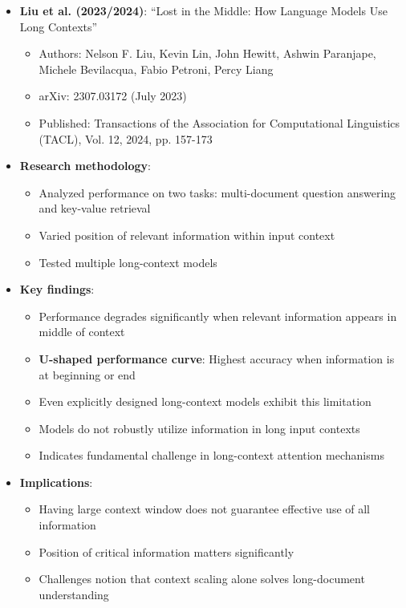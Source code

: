 \documentclass[11pt,letterpaper]{article}
\begin{document}
\begin{itemize}[leftmargin=*]
    \item \textbf{Liu et al. (2023/2024)}: ``Lost in the Middle: How Language Models Use Long Contexts''
    \begin{itemize}
        \item Authors: Nelson F. Liu, Kevin Lin, John Hewitt, Ashwin Paranjape, Michele Bevilacqua, Fabio Petroni, Percy Liang
        \item arXiv: 2307.03172 (July 2023)
        \item Published: Transactions of the Association for Computational Linguistics (TACL), Vol. 12, 2024, pp. 157-173
    \end{itemize}

    \item \textbf{Research methodology}:
    \begin{itemize}
        \item Analyzed performance on two tasks: multi-document question answering and key-value retrieval
        \item Varied position of relevant information within input context
        \item Tested multiple long-context models
    \end{itemize}

    \item \textbf{Key findings}:
    \begin{itemize}
        \item Performance degrades significantly when relevant information appears in middle of context
        \item \textbf{U-shaped performance curve}: Highest accuracy when information is at beginning or end
        \item Even explicitly designed long-context models exhibit this limitation
        \item Models do not robustly utilize information in long input contexts
        \item Indicates fundamental challenge in long-context attention mechanisms
    \end{itemize}

    \item \textbf{Implications}:
    \begin{itemize}
        \item Having large context window does not guarantee effective use of all information
        \item Position of critical information matters significantly
        \item Challenges notion that context scaling alone solves long-document understanding
    \end{itemize}
\end{itemize}
\end{document}
